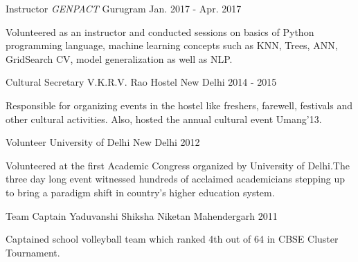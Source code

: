 \begin{cventries}
	
  \cventry
	{Instructor}
	{\emph{GENPACT}}
	{Gurugram}
	{Jan. 2017 - Apr. 2017}
	{
		\begin{cvitems}
			\item {Volunteered as an instructor and conducted sessions on basics of Python programming language, machine learning concepts such as KNN, Trees, ANN, GridSearch CV, model generalization as well as NLP.}
		\end{cvitems}
	}

  \cventry
    {Cultural Secretary}
    {V.K.R.V. Rao Hostel}
    {New Delhi}
    {2014 - 2015}
    {
      \begin{cvitems}
        \item {Responsible for organizing events in the hostel like freshers, farewell, festivals and other cultural activities. Also, hosted the annual cultural event Umang'13.}
      \end{cvitems}
    }
    
  \cventry
    {Volunteer}
    {University of Delhi}
    {New Delhi}
    {2012}
    {
      \begin{cvitems}
        \item {Volunteered at the first Academic Congress organized by University of Delhi.The three day long event witnessed hundreds of acclaimed academicians stepping up to bring a paradigm shift in country's higher education system.}
      \end{cvitems}
    }
    
  \cventry
    {Team Captain}
    {Yaduvanshi Shiksha Niketan}
    {Mahendergarh}
    {2011}
    {
      \begin{cvitems}
        \item {Captained school volleyball team which ranked 4th out of 64 in CBSE Cluster Tournament.}
      \end{cvitems}
    }
    
\end{cventries}
